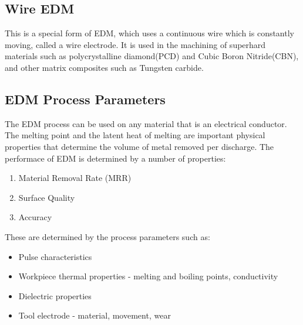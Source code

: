 \subsection{Wire EDM}
This is a special form of EDM, which uses a continuous wire which is constantly moving, called a wire electrode. It is used in the machining of superhard materials such as polycrystalline diamond(PCD) and Cubic Boron Nitride(CBN), and other matrix composites such as Tungsten carbide.

\subsection{EDM Process Parameters}
The EDM process can be used on any material that is an electrical conductor. The melting point and the latent heat of melting are important physical properties that determine the volume of metal removed per discharge.
The performace of EDM is determined by a number of properties:
\begin{enumerate}
	\item Material Removal Rate (MRR)
	\item Surface Quality
	\item Accuracy
\end{enumerate}
These are determined by the process parameters such as:
\begin{itemize}
	\item Pulse characteristics
	\item Workpiece thermal properties - melting and boiling points, conductivity
	\item Dielectric properties
	\item Tool electrode - material, movement, wear
\end{itemize}


